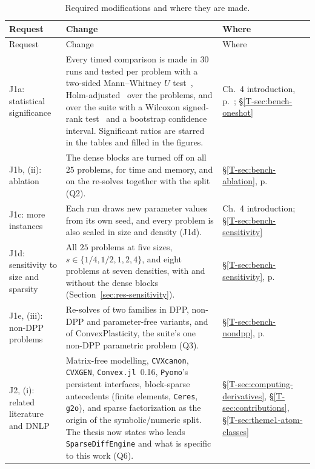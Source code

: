 \documentclass[letterpaper,12pt]{article}
\newcommand{\tsec}[1]{\S\ref{T-#1}}
\newcommand{\tpage}[1]{p.~\pageref{T-#1}}
\newcommand{\tref}[1]{\tsec{#1}, \tpage{#1}}
\begin{document}
{\small
\begin{longtable}{>{\raggedright}p{} >{\raggedright}p{}
  >{\raggedright\arraybackslash}p{}}
\caption{Required modifications and where they are made.}\label{tab:required}\\
\toprule
Request & Change & Where \\
\midrule
\endfirsthead
\toprule
Request & Change & Where \\
\midrule
\endhead
\bottomrule
\endfoot
J1a: statistical significance
  & Every timed comparison is made in $30$ runs and tested per problem with a two-sided
    Mann--Whitney $U$ test~\cite{mann1947}, Holm-adjusted~\cite{holm1979} over the problems,
    and over the suite with a Wilcoxon signed-rank test~\cite{wilcoxon1945} and a bootstrap
    confidence interval. Significant ratios are starred in the tables and filled in the
    figures.
  & Ch.~4 introduction, \tpage{sec:Theme2}; \tsec{sec:bench-oneshot} \\
J1b, (ii): ablation
  & The dense blocks are turned off on all $25$ problems, for time and memory, and on the
    re-solves together with the split (Q2).
  & \tref{sec:bench-ablation} \\
J1c: more instances
  & Each run draws new parameter values from its own seed, and every problem is also scaled
    in size and density (J1d).
  & Ch.~4 introduction; \tsec{sec:bench-sensitivity} \\
J1d: sensitivity to size and sparsity
  & All $25$ problems at five sizes, $s \in \{1/4, 1/2, 1, 2, 4\}$, and eight problems at seven
    densities, with and without the dense blocks (Section~\ref{sec:res-sensitivity}).
  & \tref{sec:bench-sensitivity} \\
J1e, (iii): non-DPP problems
  & Re-solves of two families in DPP, non-DPP and parameter-free variants, and of
    ConvexPlasticity, the suite's one non-DPP parametric problem (Q3).
  & \tref{sec:bench-nondpp} \\
J2, (i): related literature and DNLP
  & Matrix-free modelling, \texttt{CVXcanon}, \texttt{CVXGEN}, \texttt{Convex.jl}~0.16,
    \texttt{Pyomo}'s persistent interfaces, block-sparse antecedents (finite elements,
    \texttt{Ceres}, \texttt{g2o}), and sparse factorization as the origin of the
    symbolic/numeric split. The thesis now states who leads \texttt{SparseDiffEngine} and what
    is specific to this work (Q6).
  & \S\ref{T-sec:computing-derivatives}, \tsec{sec:contributions},
    \tsec{sec:theme1-atom-classes} \\

\end{longtable}}
\end{document}
